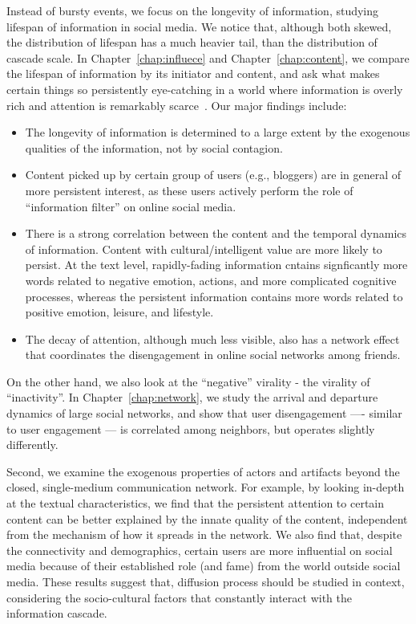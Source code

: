 \documentclass[phd,tocprelim]{cornell}
\begin{document}
Instead of bursty events, we focus on the longevity of information, studying lifespan of information in social media. We notice that, although both skewed, the distribution of lifespan has a much heavier tail, than the distribution of cascade scale.  
In Chapter~\ref{chap:influece} and Chapter~\ref{chap:content}, we compare the lifespan of information by its initiator and content, and ask what makes certain things so persistently eye-catching in a world where information is overly rich and attention is remarkably scarce~\cite{Simon-1971}. Our major findings include:
\begin{itemize}
\item The longevity of information is determined to a large extent by the exogenous qualities of the information, not by social contagion. 
\item Content picked up by certain group of users (e.g., bloggers) are in general of more persistent interest, as these users actively perform the role of ``information filter'' on online social media.
\item There is a strong correlation between the content and the temporal dynamics of information. Content with cultural/intelligent value are more likely to persist. At the text level, rapidly-fading information cntains signficantly more words related to negative emotion, actions, and more complicated cognitive processes, whereas the persistent information contains more words related to positive emotion, leisure, and lifestyle.
\item The decay of attention, although much less visible, also has a network effect that coordinates the disengagement in online social networks among friends.
\end{itemize}

On the other hand, we also look at the ``negative'' virality - the virality of ``inactivity''. In Chapter~\ref{chap:network}, we study the arrival and departure dynamics of large social networks, and show that user disengagement ---- similar to user engagement --- is correlated among neighbors, but operates slightly differently.

Second, we examine the exogenous properties of actors and artifacts beyond the closed, single-medium communication network. For example, by looking in-depth at the textual characteristics, we find that the persistent attention to certain content can be better explained by the innate quality of the content, independent from the mechanism of how it spreads in the network. We also find that, despite the connectivity and demographics, certain users are more influential on social media because of their established role (and fame) from the world outside social media. These results suggest that, diffusion process should be studied in context, considering the socio-cultural factors that constantly interact with the information cascade.
\end{document}
